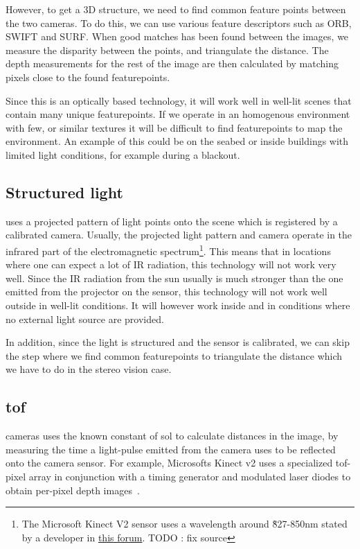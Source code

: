 However, to get a 3D structure, we need to find common feature points between the two cameras. To do this, we can use various feature descriptors such as ORB, SWIFT and SURF. When good matches has been found between the images, we measure the disparity between the points, and triangulate the distance. The depth measurements for the rest of the image are then calculated by matching pixels close to the found featurepoints.

Since this is an optically based technology, it will work well in well-lit scenes that contain many unique featurepoints. If we operate in an homogenous environment with few, or similar textures it will be difficult to find featurepoints to map the environment. An example of this could be on the seabed or inside buildings with limited light conditions, for example during a blackout.

\subsection{Structured light} uses a projected pattern of light points onto the scene which is registered by a calibrated camera. Usually, the projected light pattern and camera operate in the infrared part of the electromagnetic spectrum\footnote{The Microsoft Kinect V2 sensor uses a wavelength around \~827-850nm stated by a developer in \href{https://social.msdn.microsoft.com/Forums/en-US/e92e6f9b-4800-4b48-8ae7-5c8b1353d661/infrared-wavelength?forum=kinectv2sdk}{this forum}. {\color{red} TODO : fix source}}. This means that in locations where one can expect a lot of IR radiation, this technology will not work very well. Since the IR radiation from the sun usually is much stronger than the one emitted from the projector on the sensor, this technology will not work well outside in well-lit conditions. It will however work inside and in conditions where no external light source are provided.

In addition, since the light is structured and the sensor is calibrated, we can skip the step where we find common featurepoints to triangulate the distance which we have to do in the stereo vision case.

\subsection{\acrlong{tof}} cameras uses the known constant of \gls{sol} to calculate distances in the image, by measuring the time a light-pulse emitted from the camera uses to be reflected onto the camera sensor. For example, Microsofts Kinect v2 uses a specialized \gls{tof}-pixel array in conjunction with a timing generator and modulated laser diodes to obtain per-pixel depth images~\cite{hotchipsTalk}.

